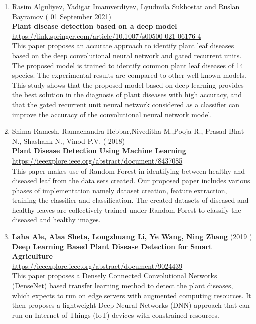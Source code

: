 \begin{enumerate}
    \item Rasim Alguliyev, Yadigar Imamverdiyev, Lyudmila Sukhostat and Ruslan Bayramov  ( 01 September 2021) \\
        \textbf{Plant disease detection based on a deep model} \\
        \href{https://link.springer.com/article/10.1007/s00500-021-06176-4}{https://link.springer.com/article/10.1007/s00500-021-06176-4} \\
        This paper proposes an accurate approach to identify plant leaf diseases based on the deep convolutional neural network and gated recurrent units. The proposed model is trained to identify common plant leaf diseases of 14 species. The experimental results are compared to other well-known models. This study shows that the proposed model based on deep learning provides the best solution in the diagnosis of plant diseases with high accuracy, and that the gated recurrent unit neural network considered as a classifier can improve the accuracy of the convolutional neural network model. 

    \item Shima Ramesh, Ramachandra Hebbar,Niveditha M.,Pooja R., Prasad Bhat N., Shashank N., Vinod P.V. ( 2018) \\
        \textbf{Plant Disease Detection Using Machine Learning} \\
        \href{https://ieeexplore.ieee.org/abstract/document/8437085}{https://ieeexplore.ieee.org/abstract/document/8437085} \\
        This paper makes use of Random Forest in identifying between healthy and diseased leaf from the data sets created. Our proposed paper includes various phases of implementation namely dataset creation, feature extraction, training the classifier and classification. The created datasets of diseased and healthy leaves are collectively trained under Random Forest to classify the diseased and healthy images.
        
    \item \textbf{Laha Ale, Alaa Sheta, Longzhuang Li, Ye Wang, Ning Zhang} (2019 ) \\
        \textbf{Deep Learning Based Plant Disease Detection for Smart Agriculture} \\
        \href{https://ieeexplore.ieee.org/abstract/document/9024439}{https://ieeexplore.ieee.org/abstract/document/9024439} \\
        This paper proposes a Densely Connected Convolutional Networks (DenseNet) based transfer learning method to detect the plant diseases, which expects to run on edge servers with augmented computing resources. It then proposes a lightweight Deep Neural Networks (DNN) approach that can run on Internet of Things (IoT) devices with constrained resources.
    
\end{enumerate}
